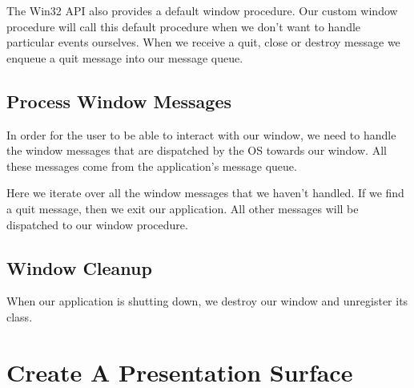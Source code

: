 The Win32 API also provides a default window procedure.
Our custom window procedure will call this default procedure when we don't want
to handle particular events ourselves.
When we receive a quit, close or destroy message we enqueue a quit message
into our message queue.

\begin{minipage}{\linewidth}{\noindent}
    
\end{minipage}

\subsection{Process Window Messages}

In order for the user to be able to interact with our window, we need to handle
the window messages that are dispatched by the OS towards our window.
All these messages come from the application's message queue.

\begin{minipage}{\linewidth}{\noindent}
    
\end{minipage}

Here we iterate over all the window messages that we haven't handled.
If we find a quit message, then we exit our application.
All other messages will be dispatched to our window procedure.

\subsection{Window Cleanup}

When our application is shutting down, we destroy our window and unregister
its class.

\begin{minipage}{\linewidth}{\noindent}
    
\end{minipage}

\section{Create A Presentation Surface}

